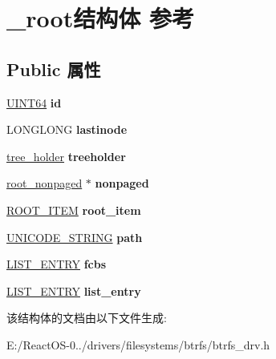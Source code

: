 \hypertarget{struct__root}{}\section{\+\_\+root结构体 参考}
\label{struct__root}
\subsection*{Public 属性}
\begin{DoxyCompactItemize}
\item 
\mbox{\label{struct__root_a76ce47afd0ea459aa91eb9fc569546f0}} 
\hyperlink{_processor_bind_8h_a57be03562867144161c1bfee95ca8f7c}{U\+I\+N\+T64} {\bfseries id}
\item 
\mbox{\label{struct__root_a9f7a6b5193ab64e069a410d390928d09}} 
L\+O\+N\+G\+L\+O\+NG {\bfseries lastinode}
\item 
\mbox{\label{struct__root_a8eefda93e673cbb62cba996746ed3c71}} 
\hyperlink{structtree__holder}{tree\+\_\+holder} {\bfseries treeholder}
\item 
\mbox{\label{struct__root_a7f0dc85533fa9d44e9049884ef1bde61}} 
\hyperlink{structroot__nonpaged}{root\+\_\+nonpaged} $\ast$ {\bfseries nonpaged}
\item 
\mbox{\label{struct__root_ac3fe3e4135b9f531f39014c8e05d4ca4}} 
\hyperlink{struct_r_o_o_t___i_t_e_m}{R\+O\+O\+T\+\_\+\+I\+T\+EM} {\bfseries root\+\_\+item}
\item 
\mbox{\label{struct__root_a6f5e2acd6f7b768ec379e0ba36710456}} 
\hyperlink{struct___u_n_i_c_o_d_e___s_t_r_i_n_g}{U\+N\+I\+C\+O\+D\+E\+\_\+\+S\+T\+R\+I\+NG} {\bfseries path}
\item 
\mbox{\label{struct__root_a8466ac2c1e6c089328f9f6c19d5db4ee}} 
\hyperlink{struct___l_i_s_t___e_n_t_r_y}{L\+I\+S\+T\+\_\+\+E\+N\+T\+RY} {\bfseries fcbs}
\item 
\mbox{\label{struct__root_aed275edbed8cc7edb0c3cdee494f02a9}} 
\hyperlink{struct___l_i_s_t___e_n_t_r_y}{L\+I\+S\+T\+\_\+\+E\+N\+T\+RY} {\bfseries list\+\_\+entry}
\end{DoxyCompactItemize}


该结构体的文档由以下文件生成\+:\begin{DoxyCompactItemize}
\item 
E\+:/\+React\+O\+S-\/0../drivers/filesystems/btrfs/btrfs\+\_\+drv.\+h\end{DoxyCompactItemize}
